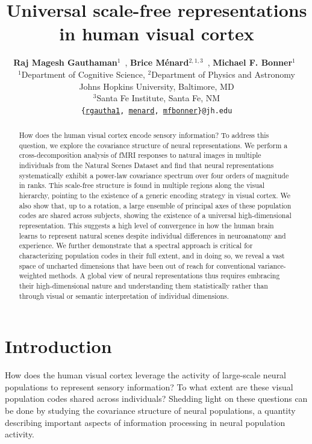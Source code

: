 \documentclass[10pt]{article}
\title{Universal scale-free representations\\in human visual cortex}
\author{
    \textbf{Raj Magesh Gauthaman$^1$}~\orcidlink{0000-0001-7121-1532},
    \textbf{Brice Ménard$^{2,1,3}$}~\orcidlink{0000-0003-3164-6974},
    \textbf{Michael F. Bonner$^1$}~\orcidlink{0000-0002-4992-674X}\\
    $^1$Department of Cognitive Science,
    $^2$Department of Physics and Astronomy\\
    Johns Hopkins University, Baltimore, MD\\
    $^3$Santa Fe Institute, Santa Fe, NM\\
    \texttt{\{\href{mailto:rgautha1@jh.edu}{rgautha1}, \href{mailto:menard@jh.edu}{menard}, \href{mailto:mfbonner@jh.edu}{mfbonner}\}@jh.edu}
}
\date{}
\begin{document}
\maketitle

\begin{abstract}
    How does the human visual cortex encode sensory information? To
    address this question, we explore the covariance structure of neural
    representations. We perform a cross-decomposition analysis of fMRI
    responses to natural images in multiple individuals from the Natural
    Scenes Dataset and find that neural representations systematically
    exhibit a power-law covariance spectrum over four orders of
    magnitude in ranks. This scale-free structure is found in multiple
    regions along the visual hierarchy, pointing to the existence of a
    generic encoding strategy in visual cortex. We also show that, up to
    a rotation, a large ensemble of principal axes of these population
    codes are shared across subjects, showing the existence of a
    universal high-dimensional representation. This suggests a high
    level of convergence in how the human brain learns to represent
    natural scenes despite individual differences in neuroanatomy and
    experience. We further demonstrate that a spectral approach is
    critical for characterizing population codes in their full extent,
    and in doing so, we reveal a vast space of uncharted dimensions that
    have been out of reach for conventional variance-weighted methods. A
    global view of neural representations thus requires embracing their
    high-dimensional nature and understanding them statistically rather
    than through visual or semantic interpretation of individual
    dimensions.
\end{abstract}

\section{Introduction}\label{introduction}

How does the human visual cortex leverage the activity of large-scale
neural populations to represent sensory information? To what extent are
these visual population codes shared across individuals? Shedding light
on these questions can be done by studying the covariance structure of
neural populations, a quantity describing important aspects of
information processing in neural population activity.
\end{document}
